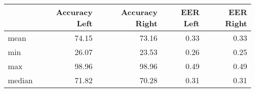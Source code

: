 \begin{tabular}{lrrrr}
\toprule
{} &  Accuracy Left &  Accuracy Right &  EER Left &  EER Right \\
\midrule
mean   &          74.15 &           73.16 &      0.33 &       0.33 \\
min    &          26.07 &           23.53 &      0.26 &       0.25 \\
max    &          98.96 &           98.96 &      0.49 &       0.49 \\
median &          71.82 &           70.28 &      0.31 &       0.31 \\
\bottomrule
\end{tabular}

